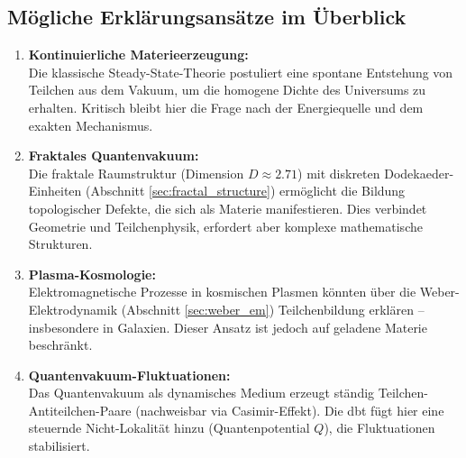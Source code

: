 \subsection{Mögliche Erklärungsansätze im Überblick}
\begin{enumerate}
    \item \textbf{Kontinuierliche Materieerzeugung:}\\Die klassische Steady-State-Theorie postuliert eine spontane Entstehung von Teilchen aus dem Vakuum, um die homogene Dichte des Universums zu erhalten. Kritisch bleibt hier die Frage nach der Energiequelle und dem exakten Mechanismus.
    \item \textbf{Fraktales Quantenvakuum:}\\Die fraktale Raumstruktur (Dimension $D \approx 2.71$) mit diskreten Dodekaeder-Einheiten (Abschnitt \ref{sec:fractal_structure}) ermöglicht die Bildung topologischer Defekte, die sich als Materie manifestieren. Dies verbindet Geometrie und Teilchenphysik, erfordert aber komplexe mathematische Strukturen.
    \item \textbf{Plasma-Kosmologie:}\\Elektromagnetische Prozesse in kosmischen Plasmen könnten über die Weber-Elektro\-dynamik (Abschnitt \ref{sec:weber_em}) Teilchenbildung erklären – insbesondere in Galaxien. Dieser Ansatz ist jedoch auf geladene Materie beschränkt.
    \item \textbf{Quantenvakuum-Fluktuationen:}\\Das Quantenvakuum als dynamisches Medium erzeugt ständig Teilchen-Antiteilchen-Paare (nachweisbar via Casimir-Effekt). Die \gls{dbt} fügt hier eine steuernde Nicht-Lokalität hinzu (Quantenpotential $Q$), die Fluktuationen stabilisiert.
\end{enumerate}

